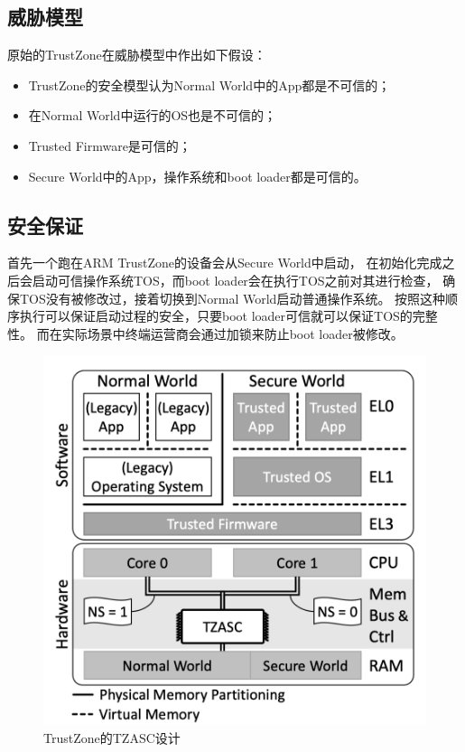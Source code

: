 \subsection {威胁模型} 
原始的TrustZone在威胁模型中作出如下假设：
\begin{itemize}
    \item
    TrustZone的安全模型认为Normal World中的App都是不可信的；
    \item
    在Normal World中运行的OS也是不可信的；
    \item 
    Trusted Firmware是可信的；
    \item
    Secure World中的App，操作系统和boot loader都是可信的。
\end{itemize}

\subsection{安全保证}
首先一个跑在ARM TrustZone的设备会从Secure World中启动，
在初始化完成之后会启动可信操作系统TOS，而boot loader会在执行TOS之前对其进行检查，
确保TOS没有被修改过，接着切换到Normal World启动普通操作系统。
按照这种顺序执行可以保证启动过程的安全，只要boot loader可信就可以保证TOS的完整性。
而在实际场景中终端运营商会通过加锁来防止boot loader被修改。

\begin{figure}
    \centering
    \includegraphics[scale=0.6]{Figures/trustzone/TZASC.png}
    \decoRule
    \caption{TrustZone的TZASC设计}
    \label{fig:tzasc}
\end{figure}
    
